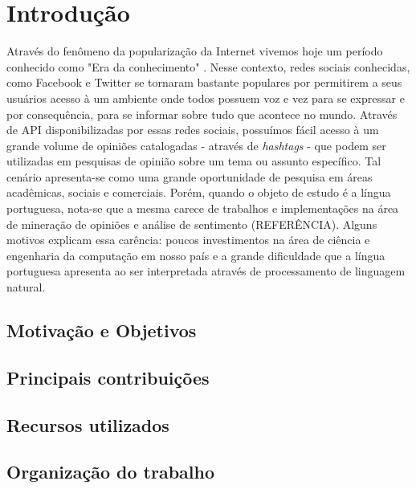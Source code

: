 \chapter{Introdução} \label{cap:1}

Através do fenômeno da popularização da Internet vivemos hoje um período conhecido como "Era da conhecimento" \cite{lastres1999informaccao}.
Nesse contexto, redes sociais conhecidas, como Facebook e Twitter se tornaram bastante populares por permitirem a seus usuários acesso à um ambiente onde todos possuem voz e vez para se expressar e por consequência, para se informar sobre tudo que acontece no mundo.
Através de \ac{API} disponibilizadas por essas redes sociais, possuímos fácil acesso à um grande volume de opiniões catalogadas - através de \textit{hashtags} - que podem ser utilizadas em pesquisas de opinião sobre um tema ou assunto específico. Tal cenário apresenta-se como uma grande oportunidade de pesquisa em áreas acadêmicas, sociais e comerciais.
Porém, quando o objeto de estudo é a língua portuguesa, nota-se que a mesma carece de trabalhos e implementações na área de mineração de opiniões e análise de sentimento (REFERÊNCIA). Alguns motivos explicam essa carência: poucos investimentos na área de ciência e engenharia da computação em nosso país e a grande dificuldade que a língua portuguesa apresenta ao ser interpretada através de processamento de linguagem natural. \cite{santos2000projecto}


\section{Motivação e Objetivos}\label{sec:1_inicio}



\section{Principais contribuições}\label{sec:1_principais_contribuicoes}

\section{Recursos utilizados}\label{sec:1_recursos_utilizados}

\section{Organização do trabalho}\label{sec:1_org}

